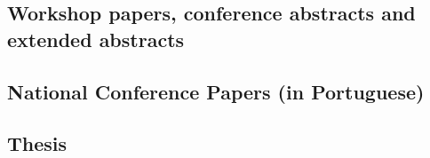 \documentclass[10pt,letterpaper]{article} %
\begin{document}
\subsection*{\noindent Workshop papers, conference abstracts and extended abstracts}
    \begin{refsection}
        
            \nocite{ gedon_resnetbased_2021 }
        
            \nocite{ gedon_first_2021 }
        
            \nocite{ hendriks_deep_2021a }
        
            \nocite{ ribeiro_occam_2021a }
        
            \nocite{ ribeiro_overparametrized_2021 }
        
            \nocite{ ribeiro_automatic_2020 }
        
            \nocite{ oliveira_explaining_2020 }
        
            \nocite{ gabriela_validation_2020 }
        
            \nocite{ paixao_ecg-age_2020 }
        
            \nocite{ ribeiro_deep_2019 }
        
            \nocite{ ribeiro_automatic_2018 }
        
            \nocite{ paixao_clinical_2018 }
        
       \newrefcontext[labelprefix= W ]
       \printbibliography[heading=none]
    \end{refsection}

\subsection*{\noindent National Conference Papers (in Portuguese)}
    \begin{refsection}
        
            \nocite{ ribeiro_relacoes_2014 }
        
       \newrefcontext[labelprefix= N ]
       \printbibliography[heading=none]
    \end{refsection}

\subsection*{\noindent Thesis}
    \begin{refsection}
        
            \nocite{ ribeiro_learning_2020 }
        
            \nocite{ ribeiro_recurrent_2017 }
        
            \nocite{ ribeiro_implementacao_2015 }
        
       \newrefcontext[labelprefix= T ]
       \printbibliography[heading=none]
    \end{refsection}
\end{document}
